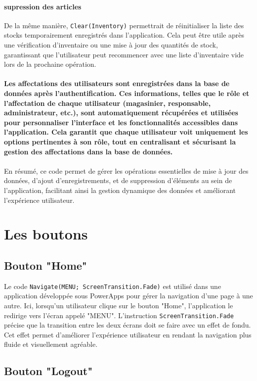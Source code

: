 \documentclass[a4paper, oneside, 12pt, final]{extreport}
\begin{document}
\paragraph{supression des articles}De la même manière, \texttt{Clear(Inventory)} permettrait de réinitialiser la liste des stocks temporairement enregistrés dans l'application. Cela peut être utile après une vérification d'inventaire ou une mise à jour des quantités de stock, garantissant que l'utilisateur peut recommencer avec une liste d'inventaire vide lors de la prochaine opération.
\\
\\
\textbf{Les affectations des utilisateurs sont enregistrées dans la base de données après l'authentification. Ces informations, telles que le rôle et l'affectation de chaque utilisateur (magasinier, responsable, administrateur, etc.), sont automatiquement récupérées et utilisées pour personnaliser l'interface et les fonctionnalités accessibles dans l'application. Cela garantit que chaque utilisateur voit uniquement les options pertinentes à son rôle, tout en centralisant et sécurisant la gestion des affectations dans la base de données.}
\\
\\
En résumé, ce code permet de gérer les opérations essentielles de mise à jour des données, d'ajout d'enregistrements, et de suppression d'éléments au sein de l'application, facilitant ainsi la gestion dynamique des données et améliorant l'expérience utilisateur.

\section{Les boutons}
\subsection{Bouton "Home"}

Le code \texttt{Navigate(MENU; ScreenTransition.Fade)} est utilisé dans une application développée sous PowerApps pour gérer la navigation d'une page à une autre. Ici, lorsqu'un utilisateur clique sur le bouton "Home", l'application le redirige vers l'écran appelé "MENU". L'instruction \texttt{ScreenTransition.Fade} précise que la transition entre les deux écrans doit se faire avec un effet de fondu. Cet effet permet d'améliorer l'expérience utilisateur en rendant la navigation plus fluide et visuellement agréable.

\subsection{Bouton "Logout"}
\end{document}

